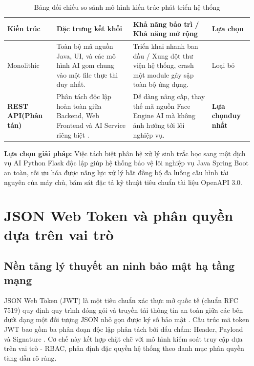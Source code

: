 \documentclass[../DoAn.tex]{subfiles}
\begin{document}
\begin{table}[ht!]
\centering
\small
\renewcommand{\arraystretch}{1.3}
\caption{Bảng đối chiếu so sánh mô hình kiến trúc phát triển hệ thống}
\label{tab:architecture_comparison}
\begin{tabular}{|>{\raggedright\arraybackslash}p{2.3cm}|>{\raggedright\arraybackslash}p{4.5cm}|>{\raggedright\arraybackslash}p{5.5cm}|>{\centering\arraybackslash}p{1.7cm}|}
\hline
\textbf{Kiến trúc} & \textbf{Đặc trưng kết khối} & \textbf{Khả năng bảo trì / Khả năng mở rộng} & \textbf{Lựa chọn} \\ \hline
Monolithic & Toàn bộ mã nguồn Java, UI, và các mô hình AI gom chung vào một file thực thi duy nhất. & Triển khai nhanh ban đầu / Xung đột thư viện hệ thống, crash một module gây sập toàn bộ ứng dụng. & Loại bỏ \\ \hline
\textbf{REST API\newline (Phân tán)} & Phân tách độc lập hoàn toàn giữa Backend, Web Frontend và AI Service riêng biệt \cite{fielding2000}. & Dễ dàng nâng cấp, thay thế mã nguồn Face Engine AI mà không ảnh hưởng tới lõi nghiệp vụ. & \textbf{Lựa chọn\newline duy nhất} \\ \hline
\end{tabular}
\end{table}

\textbf{Lựa chọn giải pháp:} Việc tách biệt phân hệ xử lý sinh trắc học sang một dịch vụ AI Python Flask độc lập giúp hệ thống bảo vệ lõi nghiệp vụ Java Spring Boot an toàn, tối ưu hóa được năng lực xử lý bất đồng bộ đa luồng cấu hình tài nguyên của máy chủ, bám sát đặc tả kỹ thuật tiêu chuẩn tài liệu OpenAPI 3.0.

\clearpage

\section{JSON Web Token và phân quyền dựa trên vai trò}
\label{section:3.5}

\subsection{Nền tảng lý thuyết an ninh bảo mật hạ tầng mạng}

JSON Web Token (JWT) là một tiêu chuẩn xác thực mở quốc tế (chuẩn RFC 7519) quy định quy trình đóng gói và truyền tải thông tin an toàn giữa các bên dưới dạng một đối tượng JSON nhỏ gọn được ký số bảo mật \cite{rfc7519}. Cấu trúc mã token JWT bao gồm ba phân đoạn độc lập phân tách bởi dấu chấm: Header, Payload và Signature \cite{rfc7519}. Cơ chế này kết hợp chặt chẽ với mô hình kiểm soát truy cập dựa trên vai trò - RBAC, phân định đặc quyền hệ thống theo danh mục phân quyền tăng dần rõ ràng.
\end{document}
